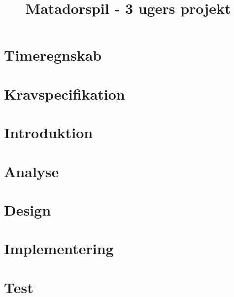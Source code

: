 \documentclass[12pt,oneside,a4paper,english]{article}
\title{Matadorspil - 3 ugers projekt} %
\begin{document}


\newpage

\thispagestyle{fancy}

\newpage
\doublespacing
\renewcommand{\baselinestretch}{1}\normalsize
\tableofcontents
\renewcommand{\baselinestretch}{1}\normalsize
\thispagestyle{fancy} %

\newpage
\section{Timeregnskab}

\thispagestyle{fancy}

\newpage
\thispagestyle{fancy}
\section{Kravspecifikation}



\newpage
\section{Introduktion}
\thispagestyle{fancy}





\newpage
\section{Analyse}

\thispagestyle{fancy}

\newpage
\section{Design}

\thispagestyle{fancy}

\newpage
\section{Implementering}
\thispagestyle{fancy}

\newpage
\section{Test}

\thispagestyle{fancy}
\end{document}
